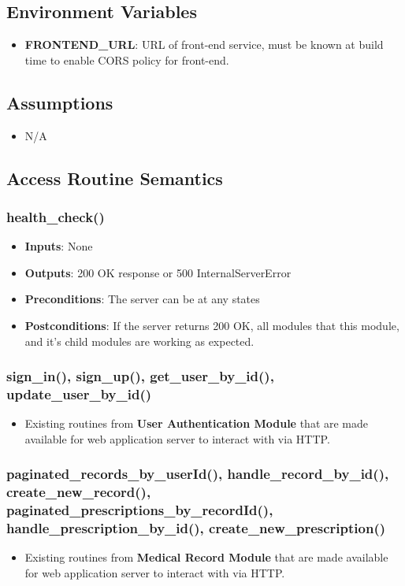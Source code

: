 \documentclass[12pt, titlepage]{article}
\begin{document}
\subsection{Environment Variables}
\begin{itemize}
    \item \textbf{FRONTEND\_URL}: URL of front-end service, must be known at build time to enable CORS policy for front-end.
\end{itemize}

\subsection{Assumptions}
\begin{itemize}
    \item N/A
\end{itemize}

\subsection{Access Routine Semantics}

\subsubsection{health\_check()}
\begin{itemize}
    \item \textbf{Inputs}: None
    \item \textbf{Outputs}: 200 OK response or 500 InternalServerError
    \item \textbf{Preconditions}: The server can be at any states
    \item \textbf{Postconditions}: If the server returns 200 OK, all modules that this module, and it's child modules are working as expected.
\end{itemize}

\subsubsection{sign\_in(), sign\_up(), get\_user\_by\_id(), update\_user\_by\_id()}
\begin{itemize}
    \item Existing routines from \textbf{User Authentication Module} that are made available for web application server to interact with via HTTP.
\end{itemize}

\subsubsection{paginated\_records\_by\_userId(), handle\_record\_by\_id(), create\_new\_record(), paginated\_prescriptions\_by\_recordId(), handle\_prescription\_by\_id(), create\_new\_prescription() }
\begin{itemize}
    \item Existing routines from \textbf{Medical Record Module} that are made available for web application server to interact with via HTTP.
\end{itemize}
\end{document}

